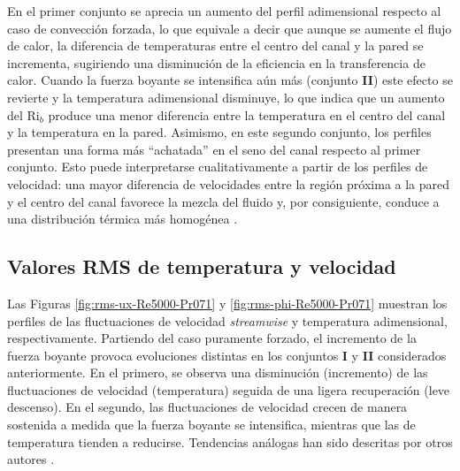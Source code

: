 En el primer conjunto se aprecia un aumento del perfil adimensional respecto al caso de convección forzada, lo que equivale a decir que aunque se aumente el flujo de calor, la diferencia de temperaturas entre el centro del canal y la pared se incrementa, sugiriendo una disminución de la eficiencia en la transferencia de calor. Cuando la fuerza boyante se intensifica aún más (conjunto \textbf{II}) este efecto se revierte y la temperatura adimensional disminuye, lo que indica que un aumento del Ri$_b$ produce una menor diferencia entre la temperatura en el centro del canal y la temperatura en la pared. Asimismo, en este segundo conjunto, los perfiles presentan una forma más ``achatada'' en el seno del canal respecto al primer conjunto. Esto puede interpretarse cualitativamente a partir de los perfiles de velocidad: una mayor diferencia de velocidades entre la región próxima a la pared y el centro del canal favorece la mezcla del fluido y, por consiguiente, conduce a una distribución térmica más homogénea \cite{aicher1997}.

\newpage
\subsection{Valores RMS de temperatura y velocidad} 

Las Figuras \ref{fig:rms-ux-Re5000-Pr071} y \ref{fig:rms-phi-Re5000-Pr071} muestran los perfiles de las fluctuaciones de velocidad \textit{streamwise} y temperatura adimensional, respectivamente. Partiendo del caso puramente forzado, el incremento de la fuerza boyante provoca evoluciones distintas en los conjuntos \textbf{I} y \textbf{II} considerados anteriormente. En el primero, se observa una disminución (incremento) de las fluctuaciones de velocidad (temperatura) seguida de una ligera recuperación (leve descenso). En el segundo, las fluctuaciones de velocidad crecen de manera sostenida a medida que la fuerza boyante se intensifica, mientras que las de temperatura tienden a reducirse. Tendencias análogas han sido descritas por otros autores \cite{you2003direct,carr1973velocity}.

